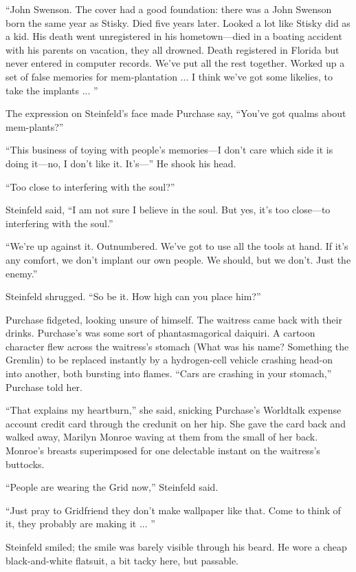 ``John Swenson. The cover had a good foundation: there was a John Swenson born the same year as Stisky. Died five years later. Looked a lot like Stisky did as a kid. His death went unregistered in his hometown—died in a boating accident with his parents on vacation, they all drowned. Death registered in Florida but never entered in computer records. We've put all the rest together. Worked up a set of false memories for mem-plantation ... I think we've got some likelies, to take the implants ... ''

The expression on Steinfeld's face made Purchase say, ``You've got qualms about mem-plants?''

``This business of toying with people's memories—I don't care which side it is doing it—no, I don't like it. It's—'' He shook his head.

``Too close to interfering with the soul?''

Steinfeld said, ``I am not sure I believe in the soul. But yes, it's too close—to interfering with the soul.''

``We're up against it. Outnumbered. We've got to use all the tools at hand. If it's any comfort, we don't implant our own people. We should, but we don't. Just the enemy.''

Steinfeld shrugged. ``So be it. How high can you place him?''

Purchase fidgeted, looking unsure of himself. The waitress came back with their drinks. Purchase's was some sort of phantasmagorical daiquiri. A cartoon character flew across the waitress's stomach (What was his name? Something the Gremlin) to be replaced instantly by a hydrogen-cell vehicle crashing head-on into another, both bursting into flames. ``Cars are crashing in your stomach,'' Purchase told her.

``That explains my heartburn,'' she said, snicking Purchase's Worldtalk expense account credit card through the credunit on her hip. She gave the card back and walked away, Marilyn Monroe waving at them from the small of her back. Monroe's breasts superimposed for one delectable instant on the waitress's buttocks.

``People are wearing the Grid now,'' Steinfeld said.

``Just pray to Gridfriend they don't make wallpaper like that. Come to think of it, they probably are making it ... ''

Steinfeld smiled; the smile was barely visible through his beard. He wore a cheap black-and-white flatsuit, a bit tacky here, but passable.


